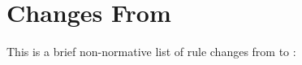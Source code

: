 \section{Changes From \LastRCYear}

This is a brief non-normative list of rule changes from \LastRCYear to \RCYear:
\begin{itemize}
\end{itemize}
